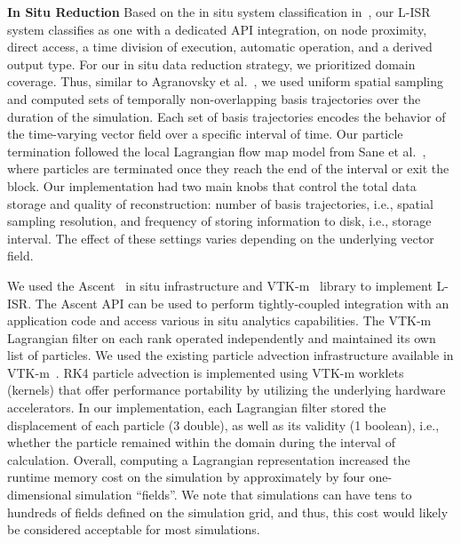 \textbf{In Situ Reduction}
%
Based on the in situ system classification in~\cite{childs2020terminology}, our L-ISR system classifies as one with a dedicated API integration, on node proximity, direct access, a time division of execution, automatic operation, and a derived output type.
%
For our in situ data reduction strategy, we prioritized domain coverage.
%
Thus, similar to Agranovsky et al.~\cite{agranovsky2014improved}, we used uniform spatial sampling and computed sets of temporally non-overlapping basis trajectories over the duration of the simulation.
%
%
Each set of basis trajectories encodes the behavior of the time-varying vector field over a specific interval of time.
%
%
%
Our particle termination followed the local Lagrangian flow map model from Sane et al.~\cite{sane2020scalable}, where particles are terminated once they reach the end of the interval or exit the block.
%
Our implementation had two main knobs that control the total data storage and quality of reconstruction: number of basis trajectories, i.e., spatial sampling resolution, and frequency of storing information to disk, i.e., storage interval.
%
The effect of these settings varies depending on the underlying vector field. 
%

We used the Ascent~\cite{Larsen2017Alpine} in situ infrastructure and VTK-m~\cite{moreland2016vtk} library to implement L-ISR. 
%
The Ascent API can be used to perform tightly-coupled integration with an application code and access various in situ analytics capabilities.
The VTK-m Lagrangian filter on each rank operated independently and maintained its own list of particles.
%
We used the existing particle advection infrastructure available in VTK-m~\cite{pugmire2018performance}.
%
RK4 particle advection is implemented using VTK-m worklets (kernels) that offer performance portability by utilizing the underlying hardware accelerators.
%
In our implementation, each Lagrangian filter stored the displacement of each particle (3 double), as well as its validity (1 boolean), i.e., whether the particle remained within the domain during the interval of calculation.
%
Overall, computing a Lagrangian representation increased the runtime memory cost on the simulation by approximately by four one-dimensional simulation ``fields''.
%
We note that simulations can have tens to hundreds of fields defined on the simulation grid, and thus, this cost would likely be considered acceptable for most simulations.
%
%

